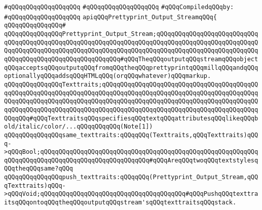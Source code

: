 \verb|#qQQqqQQqqQQqqQQqqQQq|\newline
\verb|#qQQqqQQqqQQqqQQqqQQq|\newline
\newline
\verb|#qQQqCompiledqQQqby:|\newline
\verb|#qQQqqQQqqQQqqQQqqQQq|\newline
\newline
\newline
\verb|apiqQQqPrettyprint_Output_StreamqQQq{|\newline
\verb|qQQqqQQqqQQqqQQq#|\newline
\verb|qQQqqQQqqQQqqQQqPrettyprint_Output_Stream;qQQqqQQqqQQqqQQqqQQqqQQqqQQqqQQqqQQqqQQqqQQqqQQqqQQqqQQqqQQqqQQqqQQqqQQqqQQqqQQqqQQqqQQqqQQqqQQqqQQqqQQqqQQqqQQqqQQqqQQqqQQqqQQqqQQqqQQqqQQqqQQqqQQqqQQqqQQqqQQqqQQqqQQqqQQqqQQqqQQqqQQqqQQqqQQqqQQqqQQq#qQQqTheqQQqoutputqQQqstreamqQQqobjectqQQqacceptsqQQqoutputqQQqfromqQQqtheqQQqprettyprintqQQqmillqQQqandqQQqoptionallyqQQqaddsqQQqHTMLqQQq(orqQQqwhatever)qQQqmarkup.|\newline
\newline
\verb|qQQqqQQqqQQqqQQqTexttraits;qQQqqQQqqQQqqQQqqQQqqQQqqQQqqQQqqQQqqQQqqQQqqQQqqQQqqQQqqQQqqQQqqQQqqQQqqQQqqQQqqQQqqQQqqQQqqQQqqQQqqQQqqQQqqQQqqQQqqQQqqQQqqQQqqQQqqQQqqQQqqQQqqQQqqQQqqQQqqQQqqQQqqQQqqQQqqQQqqQQqqQQqqQQqqQQqqQQqqQQqqQQqqQQqqQQqqQQqqQQqqQQqqQQqqQQqqQQqqQQqqQQqqQQqqQQqqQQqqQQq#qQQqTexttraitsqQQqspecifiesqQQqtextqQQqattributesqQQqlikeqQQqbold/italic/color/...qQQqqQQqqQQq(Note[1])|\newline
\newline
\verb|qQQqqQQqqQQqqQQqsame_texttraits:qQQqqQQq(Texttraits,qQQqTexttraits)qQQq->qQQqBool;qQQqqQQqqQQqqQQqqQQqqQQqqQQqqQQqqQQqqQQqqQQqqQQqqQQqqQQqqQQqqQQqqQQqqQQqqQQqqQQqqQQqqQQqqQQqqQQqqQQq#qQQqAreqQQqtwoqQQqtextstylesqQQqtheqQQqsame?qQQq|\newline
\newline
\verb|qQQqqQQqqQQqqQQqpush_texttraits:qQQqqQQq(Prettyprint_Output_Stream,qQQqTexttraits)qQQq->qQQqVoid;qQQqqQQqqQQqqQQqqQQqqQQqqQQqqQQqqQQqqQQq#qQQqPushqQQqtexttraitsqQQqontoqQQqtheqQQqoutputqQQqstream'sqQQqtexttraitsqQQqstack.|\newline
